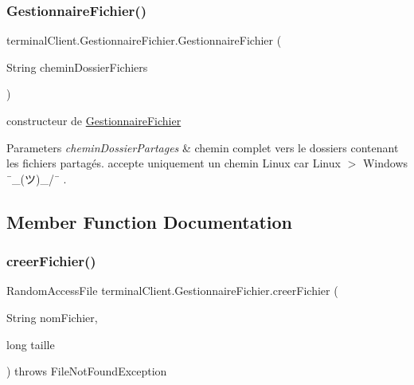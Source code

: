 \subsubsection{\texorpdfstring{Gestionnaire\+Fichier()}{GestionnaireFichier()}}
{\footnotesize\ttfamily terminal\+Client.\+Gestionnaire\+Fichier.\+Gestionnaire\+Fichier (\begin{DoxyParamCaption}\item[{String}]{chemin\+Dossier\+Fichiers }\end{DoxyParamCaption})\hspace{0.3cm}{\ttfamily [inline]}}



constructeur de \hyperlink{classterminalClient_1_1GestionnaireFichier}{Gestionnaire\+Fichier} 


\begin{DoxyParams}{Parameters}
{\em chemin\+Dossier\+Partages} & chemin complet vers le dossiers contenant les fichiers partagés. accepte uniquement un chemin Linux car Linux $>$ Windows ¯\+\_\+(ツ)\+\_\+/¯ . \\
\hline
\end{DoxyParams}


\subsection{Member Function Documentation}
\mbox{\label{classterminalClient_1_1GestionnaireFichier_a81c7f37ddcde7593ad44cc46063e83c9}} 
\subsubsection{\texorpdfstring{creer\+Fichier()}{creerFichier()}}
{\footnotesize\ttfamily Random\+Access\+File terminal\+Client.\+Gestionnaire\+Fichier.\+creer\+Fichier (\begin{DoxyParamCaption}\item[{String}]{nom\+Fichier,  }\item[{long}]{taille }\end{DoxyParamCaption}) throws File\+Not\+Found\+Exception\hspace{0.3cm}{\ttfamily [inline]}}



